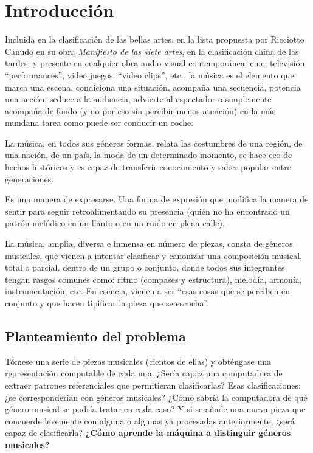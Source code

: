 
\cleardoublepage

\chapter{Introducción}

Incluida en la clasificación de las bellas artes, en la lista propuesta por Ricciotto Canudo en su obra \emph{Manifiesto de las siete artes}, en la clasificación china de las tardes; y presente en cualquier obra audio visual contemporánea: cine, televisión, ``performances'', video juegos, ``video clips'', etc., la música es el elemento que marca una escena, condiciona una situación, acompaña una secuencia, potencia una acción, seduce a la audiencia, advierte al espectador o simplemente acompaña de fondo (y no por eso sin percibir menos atención) en la más mundana tarea como puede ser conducir un coche.

La música, en todos sus géneros formas, relata las costumbres de una región, de una nación, de un país, la moda de un determinado momento, se hace eco de hechos históricos y es capaz de transferir conocimiento y saber popular entre generaciones.

Es una manera de expresarse. Una forma de expresión que modifica la manera de sentir para seguir retroalimentando su presencia (quién no ha encontrado un patrón melódico en un llanto o en un ruido en plena calle).

La música, amplia, diversa e inmensa en número de piezas, consta de géneros musicales, que vienen a intentar clasificar y canonizar una composición musical, total o parcial, dentro de un grupo o conjunto, donde todos sus integrantes tengan rasgos comunes como: ritmo (compases y estructura), melodía, armonía, instrumentación, etc. En esencia, vienen a ser ``esas cosas que se perciben en conjunto y que hacen tipificar la pieza que se escucha''.

\section{Planteamiento del problema}

Tómese una serie de piezas musicales (cientos de ellas) y obténgase una representación computable de cada una. ¿Sería capaz una computadora de extraer patrones referenciales que permitieran clasificarlas? Esas clasificaciones: ¿se corresponderían con géneros musicales? ¿Cómo sabría la computadora de qué género musical se podría tratar en cada caso? Y si se añade una nueva pieza que concuerde levemente con alguna o algunas ya procesadas anteriormente, ¿será capaz de clasificarla? \textbf{¿Cómo aprende la máquina a distinguir géneros musicales?}

